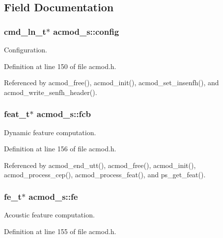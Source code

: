 \subsection{Field Documentation}
\subsubsection[{config}]{\setlength{\rightskip}{0pt plus 5cm}cmd\-\_\-ln\-\_\-t$\ast$ acmod\-\_\-s\-::config}\label{structacmod__s_a3563f4d0bdc48d3ee140b9e28806279d}


Configuration. 



Definition at line 150 of file acmod.\-h.



Referenced by acmod\-\_\-free(), acmod\-\_\-init(), acmod\-\_\-set\-\_\-insenfh(), and acmod\-\_\-write\-\_\-senfh\-\_\-header().

\subsubsection[{fcb}]{\setlength{\rightskip}{0pt plus 5cm}feat\-\_\-t$\ast$ acmod\-\_\-s\-::fcb}\label{structacmod__s_a37ec6c2b1f3ada764842e08481239b34}


Dynamic feature computation. 



Definition at line 156 of file acmod.\-h.



Referenced by acmod\-\_\-end\-\_\-utt(), acmod\-\_\-free(), acmod\-\_\-init(), acmod\-\_\-process\-\_\-cep(), acmod\-\_\-process\-\_\-feat(), and ps\-\_\-get\-\_\-feat().

\subsubsection[{fe}]{\setlength{\rightskip}{0pt plus 5cm}fe\-\_\-t$\ast$ acmod\-\_\-s\-::fe}\label{structacmod__s_a56eaceb9b6a1cbcccd09cf42cfa87231}


Acoustic feature computation. 



Definition at line 155 of file acmod.\-h.



